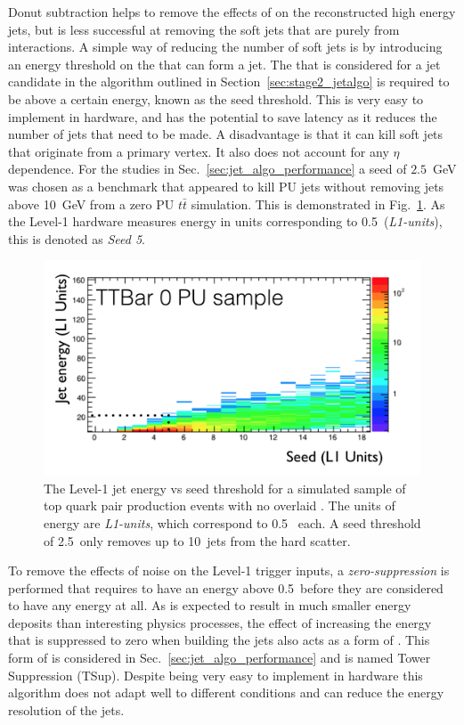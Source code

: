 Donut subtraction helps to remove the effects of \PU on the
reconstructed high energy jets, but is less successful at removing the
soft jets that are purely from \PU interactions. A simple way of
reducing the number of soft jets is by introducing an energy threshold
on the \TT that can form a jet. The \TT that is considered for a jet
candidate in the algorithm outlined in
Section~\ref{sec:stage2_jetalgo} is required to be above a certain
energy, known as the seed threshold. This is very easy to implement in
hardware, and has the potential to save latency as it reduces the
number of jets that need to be made. A disadvantage is that it can
kill soft jets that originate from a primary vertex. It also does not
account for any $\eta$ dependence. For the studies in
Sec.~\ref{sec:jet_algo_performance} a seed of $2.5$~GeV was
chosen as a benchmark that appeared to kill PU jets without removing
jets above 10~GeV from a zero PU $t\bar{t}$ \MC simulation. This is
demonstrated in Fig.~\ref{fig:noPUSeedTTbar}. As the Level-1 hardware
measures energy in units corresponding to 0.5~\gev (\emph{L1-units}),
this is denoted as \emph{Seed 5}. 

\begin{figure}
	\begin{center}
		\includegraphics[width=0.8\linewidth]{figs/trigger/noPUSeedTTbar}
  \caption{The Level-1 jet energy vs seed threshold for a simulated
  sample of top quark pair production events with no overlaid \PU. The
  units of energy are \emph{L1-units}, which correspond to 0.5~\gev
  each. A seed threshold of 2.5~\gev only removes up to 10~\gev jets
  from the hard scatter.}
	\label{fig:noPUSeedTTbar}
	\end{center}
\end{figure}

To remove the effects of noise on the Level-1 trigger inputs, a
\emph{zero-suppression} is performed that requires \TTs to have an
energy above 0.5~\gev before they are considered to have any energy at
all. As \PU is expected to result in much smaller energy deposits than
interesting physics processes, the effect of increasing the energy
that is suppressed to zero when building the jets also acts as a form
of \PUS. This form of \PUS is considered in
Sec.~\ref{sec:jet_algo_performance} and is named Tower Suppression
(TSup). Despite being very easy to implement in hardware this
algorithm does not adapt well to different \PU conditions and can
reduce the energy resolution of the jets.

